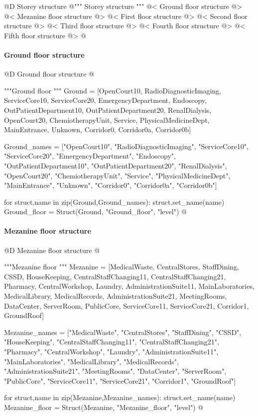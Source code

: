 \documentclass[11pt,oneside]{article}    %
\begin{document}
@D Storey structure
@{""" Storey structure """
@< Ground floor structure @>
@< Mezanine floor structure @>
@< First floor structure @>
@< Second floor structure @>
@< Third floor structure @>
@< Fourth floor structure @>
@< Fifth floor structure @>
@}


\paragraph{Ground floor structure}
@D Ground floor structure
@{"""Ground floor """
Ground = [OpenCourt10, RadioDiagnosticImaging,
    ServiceCore10, ServiceCore20,  EmergencyDepartment, Endoscopy,
    OutPatientDepartment10, OutPatientDepartment20, RenalDialysis,
    OpenCourt20, ChemiotherapyUnit, Service, PhysicalMedicineDept,
    MainEntrance, Unknown, Corridor0, Corridor0a, Corridor0b]
    
Ground_names = ["OpenCourt10", "RadioDiagnosticImaging",
    "ServiceCore10", "ServiceCore20", "EmergencyDepartment", "Endoscopy",
    "OutPatientDepartment10", "OutPatientDepartment20", "RenalDialysis",
    "OpenCourt20", "ChemiotherapyUnit", "Service", "PhysicalMedicineDept",
    "MainEntrance", "Unknown", "Corridor0", "Corridor0a", "Corridor0b"]

for struct,name in zip(Ground,Ground_names): struct.set_name(name)
Ground_floor = Struct(Ground, "Ground_floor", "level")
@}

\paragraph{Mezanine floor structure}
@D Mezanine floor structure
@{"""Mezanine floor """
Mezanine = [MedicalWaste, CentralStores,
    StaffDining, CSSD, HouseKeeping,  CentralStaffChanging11,
    CentralStaffChanging21, Pharmacy, CentralWorkshop, Laundry,
    AdministrationSuite11, MainLaboratories, MedicalLibrary, MedicalRecords,
    AdministrationSuite21, MeetingRooms, DataCenter, ServerRoom, PublicCore,
    ServiceCore11, ServiceCore21, Corridor1, GroundRoof]

Mezanine_names = ["MedicalWaste", "CentralStores",
    "StaffDining", "CSSD", "HouseKeeping", "CentralStaffChanging11",
    "CentralStaffChanging21", "Pharmacy", "CentralWorkshop", "Laundry",
    "AdministrationSuite11", "MainLaboratories", "MedicalLibrary", "MedicalRecords",
    "AdministrationSuite21", "MeetingRooms", "DataCenter", "ServerRoom", "PublicCore",
    "ServiceCore11", "ServiceCore21", "Corridor1", "GroundRoof"]

for struct,name in zip(Mezanine,Mezanine_names): struct.set_name(name)
Mezanine_floor = Struct(Mezanine, "Mezanine_floor", "level")
@}
\end{document}
